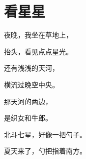 \documentclass[12pt,UTF-8,openany]{ctexbook}
\begin{document}
\hanzibox{}\hanzibox{}\hanzibox{}\hanzibox{}\hspace{1em}\hanzibox{}\hanzibox{}\hanzibox{}\hanzibox{}

\hanzibox{}\hanzibox{}\hanzibox{}\hanzibox{}\hspace{1em}\hanzibox{}\hanzibox{}\hanzibox{}\hanzibox{}






\chapter{看星星}

\begin{large}
    
    夜晚，我坐在草地上，
    
    抬头，看见点点星光。
    
    还有浅浅的天河，
    
    横流过晚空中央。
    
    那天河的两边，
    
    是织女和牛郎。
    
    北斗七星，好像一把勺子。
    
    夏天来了，勺把指着南方。
    
\end{large}


\clearpage

\begin{center}
    
    
\end{center}


\hanzibox{}\hanzibox{}\hanzibox{}\hanzibox{}\hspace{1em}\hanzibox{}\hanzibox{}\hanzibox{}\hanzibox{}

\hanzibox{}\hanzibox{}\hanzibox{}\hanzibox{}\hspace{1em}\hanzibox{}\hanzibox{}\hanzibox{}\hanzibox{}

\hanzibox{}\hanzibox{}\hanzibox{}\hanzibox{}\hspace{1em}\hanzibox{}\hanzibox{}\hanzibox{}\hanzibox{}

\hanzibox{}\hanzibox{}\hanzibox{}\hanzibox{}\hspace{1em}\hanzibox{}\hanzibox{}\hanzibox{}\hanzibox{}
\end{document}
